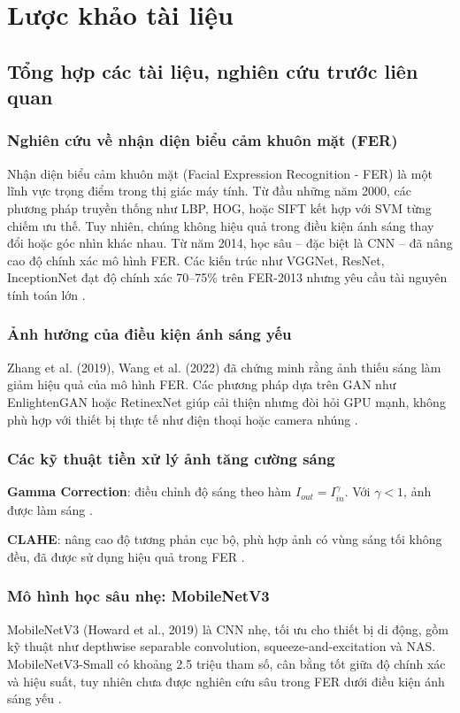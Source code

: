 \section{Lược khảo tài liệu} %
\subsection{Tổng hợp các tài liệu, nghiên cứu trước liên quan}

\subsubsection{Nghiên cứu về nhận diện biểu cảm khuôn mặt (FER)}
Nhận diện biểu cảm khuôn mặt (Facial Expression Recognition - FER) là một lĩnh vực trọng điểm trong thị giác máy tính. Từ đầu những năm 2000, các phương pháp truyền thống như LBP, HOG, hoặc SIFT kết hợp với SVM từng chiếm ưu thế. Tuy nhiên, chúng không hiệu quả trong điều kiện ánh sáng thay đổi hoặc góc nhìn khác nhau. Từ năm 2014, học sâu – đặc biệt là CNN – đã nâng cao độ chính xác mô hình FER. Các kiến trúc như VGGNet, ResNet, InceptionNet đạt độ chính xác 70--75\% trên FER-2013 nhưng yêu cầu tài nguyên tính toán lớn \cite{goodfellow2013challenges}.

\subsubsection{Ảnh hưởng của điều kiện ánh sáng yếu}
Zhang et al. (2019), Wang et al. (2022) đã chứng minh rằng ảnh thiếu sáng làm giảm hiệu quả của mô hình FER. Các phương pháp dựa trên GAN như EnlightenGAN hoặc RetinexNet giúp cải thiện nhưng đòi hỏi GPU mạnh, không phù hợp với thiết bị thực tế như điện thoại hoặc camera nhúng \cite{zhang2019ganfer, wang2022lowlight}.

\subsubsection{Các kỹ thuật tiền xử lý ảnh tăng cường sáng}
\textbf{Gamma Correction}: điều chỉnh độ sáng theo hàm \(I_{out} = I_{in}^\gamma\). Với \(\gamma < 1\), ảnh được làm sáng \cite{ying2017gamma}.\par
\textbf{CLAHE}: nâng cao độ tương phản cục bộ, phù hợp ảnh có vùng sáng tối không đều, đã được sử dụng hiệu quả trong FER \cite{pizer1987clahe}.

\subsubsection{Mô hình học sâu nhẹ: MobileNetV3}
MobileNetV3 (Howard et al., 2019) là CNN nhẹ, tối ưu cho thiết bị di động, gồm kỹ thuật như depthwise separable convolution, squeeze-and-excitation và NAS. MobileNetV3-Small có khoảng 2.5 triệu tham số, cân bằng tốt giữa độ chính xác và hiệu suất, tuy nhiên chưa được nghiên cứu sâu trong FER dưới điều kiện ánh sáng yếu \cite{howard2019mobilenetv3, sandler2018mobilenetv2}.

